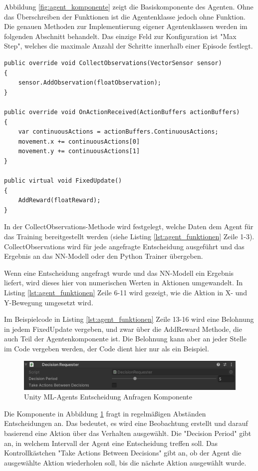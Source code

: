 Abbildung \ref{fig:agent_komponente} zeigt die Basiskomponente des Agenten. Ohne das Überschreiben der Funktionen ist die Agentenklasse jedoch ohne Funktion. Die genauen Methoden zur Implementierung eigener Agentenklassen werden im folgenden Abschnitt behandelt. Das einzige Feld zur Konfiguration ist "Max Step", welches die maximale Anzahl der Schritte innerhalb einer Episode festlegt.

\begin{lstlisting}[caption={Agent Funktionen},captionpos=b,label={lst:agent_funktionen}]
public override void CollectObservations(VectorSensor sensor)
{
    sensor.AddObservation(floatObservation);
}

public override void OnActionReceived(ActionBuffers actionBuffers)
{
    var continuousActions = actionBuffers.ContinuousActions;
    movement.x += continuousActions[0]
    movement.y += continuousActions[1]
}

public virtual void FixedUpdate()
{
    AddReward(floatReward);
}
\end{lstlisting}

In der CollectObservations-Methode wird festgelegt, welche Daten dem Agent für das Training bereitgestellt werden (siehe Listing \ref{lst:agent_funktionen} Zeile 1-3). CollectObservations wird für jede angefragte Entscheidung ausgeführt und das Ergebnis an das NN-Modell oder den Python Trainer übergeben.

Wenn eine Entscheidung angefragt wurde und das NN-Modell ein Ergebnis liefert, wird dieses hier von numerischen Werten in Aktionen umgewandelt. In Listing \ref{lst:agent_funktionen} Zeile 6-11 wird gezeigt, wie die Aktion in X- und Y-Bewegung umgesetzt wird.

Im Beispielcode in Listing \ref{lst:agent_funktionen} Zeile 13-16 wird eine Belohnung in jedem FixedUpdate vergeben, und zwar über die AddReward Methode, die auch Teil der Agentenkomponente ist. Die Belohnung kann aber an jeder Stelle im Code vergeben werden, der Code dient hier nur als ein Beispiel.

\begin{figure}[H]
  \centering  
  \includegraphics[scale=0.5]{img/entscheidung_anfragen_komponente.png}
  \caption{Unity ML-Agents Entscheidung Anfragen Komponente}
  \label{fig:entscheidung_anfragen_komponente}
\end{figure}

Die Komponente in Abbildung \ref{fig:entscheidung_anfragen_komponente} fragt in regelmäßigen Abständen Entscheidungen an. Das bedeutet, es wird eine Beobachtung erstellt und darauf basierend eine Aktion über das Verhalten ausgewählt. Die "Decision Period" gibt an, in welchem Intervall der Agent eine Entscheidung treffen soll. Das Kontrollkästchen "Take Actions Between Decisions" gibt an, ob der Agent die ausgewählte Aktion wiederholen soll, bis die nächste Aktion ausgewählt wurde.